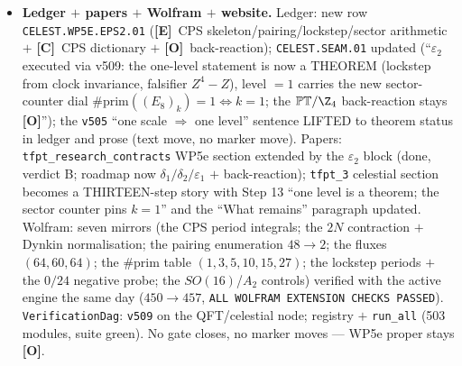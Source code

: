 \documentclass[11pt]{article}
\providecommand{\mE}{\textbf{[E]}}\providecommand{\mC}{\textbf{[C]}}
\providecommand{\mO}{\textbf{[O]}}\providecommand{\mX}{\textbf{[X]}}
\begin{document}
\begin{itemize}[leftmargin=1.5em]
the monodromy is the pure phase $i$ and $\det(A{-}1)=-4\neq0$ (no invariant flux vector) ---
$k_1=k_2=k_3$ IS A THEOREM of clock invariance; NEGATIVE PROBE (new falsifier): the
clock-forbidden family $Z^4{-}Z$ (smooth, disc $-27$, branch points $\{0,1,\omega,\omega^2\}$
not a $\mu_4$ orbit): over ALL $24$ orderings ZERO chains with three equal period moduli ($1$ vs
$\sqrt3$); HONEST LIMIT: uniform flux doubling keeps the lockstep --- the theorem proves
EQUALITY, not the value ($1$ from the counters and the CPS minimal quantum $N=1$).
\emph{Negative controls}: $k=2$ (current count $0$, residual $360$, prefactor $-31/48$,
$\#$prim $3$ --- while the lockstep dial honestly does NOT fire); $SO(16)$ (fluxes $(0,60,0)$:
spheres $1/3$ FLUX-DARK, defect $-30\neq-78$, condensation stuck at $4=\det\mathrm{Cartan}(D_8)$);
$A_2$ (det $3\neq4$, glue diagonal $23/24\notin\Z$, $\mu=12$ no perfect square: NO Lagrangian
subgroup, Coxeter $3\neq4$). Typed honestly: the CPS dictionary itself on $\mathbb{PT}/\Z_4$
stays \mC\ (their geometry is the $\mathbb C^2$ blow-up with one $(-1)$-sphere and
$\mathfrak{so}(8)$ at negative level --- not the $A_3$ ALE); the type-I B-model back-reaction
stays \mO\ (the same fence as \texttt{v502}/\texttt{v505}).
\item \textbf{Ledger $+$ papers $+$ Wolfram $+$ website.} Ledger: new row
\texttt{CELEST.WP5E.EPS2.01} (\mE\ CPS skeleton/pairing/lockstep/sector arithmetic $+$ \mC\ CPS
dictionary $+$ \mO\ back-reaction); \texttt{CELEST.SEAM.01} updated (``$\varepsilon_2$ executed
via v509: the one-level statement is now a THEOREM (lockstep from clock invariance, falsifier
$Z^4{-}Z$), level $=1$ carries the new sector-counter dial $\#\mathrm{prim}((E_8)_k)=1
\Leftrightarrow k=1$; the $\mathbb{PT}/\Z_4$ back-reaction stays \mO''); the \texttt{v505} ``one
scale $\Rightarrow$ one level'' sentence LIFTED to theorem status in ledger and prose (text move,
no marker move). Papers: \texttt{tfpt\_research\_contracts} WP5e section extended by the
$\varepsilon_2$ block (done, verdict B; roadmap now $\delta_1/\delta_2/\varepsilon_1$ $+$
back-reaction); \texttt{tfpt\_3} celestial section becomes a THIRTEEN-step story with Step 13
``one level is a theorem; the sector counter pins $k=1$'' and the ``What remains'' paragraph
updated. Wolfram: seven mirrors (the CPS period integrals; the $2N$ contraction $+$ Dynkin
normalisation; the pairing enumeration $48\to2$; the fluxes $(64,60,64)$; the $\#$prim table
$(1,3,5,10,15,27)$; the lockstep periods $+$ the $0/24$ negative probe; the $SO(16)$/$A_2$
controls) verified with the active engine the same day ($450\to457$, \texttt{ALL WOLFRAM
EXTENSION CHECKS PASSED}). \texttt{VerificationDag}: \texttt{v509} on the QFT/celestial node;
registry $+$ \texttt{run\_all} (503 modules, suite green). No gate closes, no marker moves ---
WP5e proper stays \mO.
\end{itemize}
\end{document}
